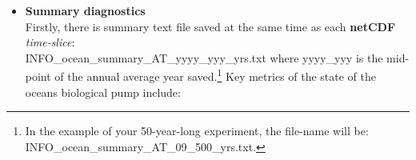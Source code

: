 \begin{itemize}[noitemsep]

\vspace{1mm}
\item \textbf{Summary diagnostics}
\vspace{1mm}
\\Firstly, there is summary text file saved at the same time as each \textbf{netCDF} \textit{time-slice}: 
\\\textsf{\footnotesize INFO\_ocean\_summary\_AT\_yyyy\_yyy\_yrs.txt}
where \textsf{\footnotesize yyyy\_yyy} is the mid-point of the annual average year saved.\footnote{In the example of your 50-year-long experiment, the file-name will be: \\\textsf{INFO\_ocean\_summary\_AT\_09\_500\_yrs.txt}.} Key metrics of the state of the oceans biological pump include:


\end{itemize}
